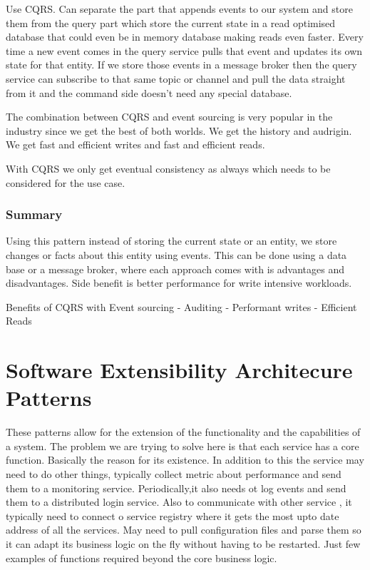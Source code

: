 \documentclass[a4paper, 11pt]{book}
\begin{document}
    Use CQRS.
    Can separate the part that appends events to our system and store them from the query part which store the current state in a read optimised database that could even be in memory database making reads even faster.
    Every time a new event comes in the query service pulls that event and updates its own state for that entity.
    If we store those events in a message broker then the query service can subscribe to that same topic or channel and pull the data straight from it and the command side doesn't need any special database.

    The combination between CQRS and event sourcing is very popular in the industry since we get the best of both worlds.
    We get the history and audrigin.
    We get fast and efficient writes and fast and efficient reads.

    With CQRS we only get eventual consistency as always which needs to be considered for the use case.

    \subsubsection{Summary}
    Using this pattern instead of storing the current state or an entity, we store changes or facts about this entity using events.
    This can be done using a data base or a message broker, where each approach comes with is advantages and disadvantages.
    Side benefit is better performance for write intensive workloads.

    Benefits of CQRS with Event sourcing
    - Auditing
    - Performant writes
    - Efficient Reads


    \section{Software Extensibility Architecure Patterns}

    These patterns allow for the extension of the functionality and the capabilities of a system.
    The problem we are trying to solve here is that each service has a core function.
    Basically the reason for its existence.
    In addition to this the service may need to do other things, typically collect metric about performance and send them to a monitoring service.
    Periodically,it also needs ot log events and send them to a distributed login service.
    Also to communicate with other service , it typically need to connect o service registry where it gets the most upto date address of all the services.
    May need to pull configuration files and parse them so it can adapt its business logic on the fly without having to be restarted.
    Just few examples of functions required beyond the core business logic.
\end{document}
